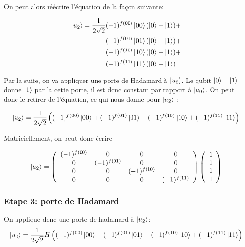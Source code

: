 On peut alors réécrire l'équation de la façon suivante: 



\begin{align*}
  \ket{u_2} = \frac{1}{2\sqrt{2}} & (-1)^{f(00)} \ket{00}  (\ket{0} - \ket{1}) + \\
&(-1)^{f(01)} \ket{01}  (\ket{0} - \ket{1}) + \\
&(-1)^{f(10)} \ket{10}  (\ket{0} - \ket{1}) + \\
&(-1)^{f(11)} \ket{11}  (\ket{0} - \ket{1}) 
\end{align*}

Par la suite, on va appliquer une porte de Hadamard à $\ket{u_2}$. Le qubit $\ket{0} - \ket{1}$ donne $\ket{1}$ par la cette porte, il est donc constant par rapport à $\ket{u_0}$. On peut donc le retirer de l'équation, ce qui nous donne pour $\ket{u_2}$ :

\begin{equation}
  \label{eq:3}
\ket{u_2} = \frac{1}{2\sqrt{2}} \left( (-1)^{f(00)} \ket{00} + (-1)^{f(01)} \ket{01} + (-1)^{f(10)} \ket{10} + (-1)^{f(11)} \ket{11} \right) 
\end{equation}


Matriciellement, on peut donc écrire

\begin{equation}
  \label{eq:4}
\ket{u_2} = \left(  \begin{array}{cccc}
     (-1)^{f(00)}  &0 & 0 &0 \\
     0 & (-1)^{f(01)} & 0 &0 \\
     0 &0 & (-1)^{f(10)} &0 \\
     0 &0 & 0 & (-1)^{f(11)} \\
        \end{array}
      \right)
      \left(  \begin{array}{c}
                1 \\
                1 \\
                1 \\
                1 
              \end{array}
      \right)      
\end{equation}


\subsubsection{Etape 3: porte de Hadamard}

On applique donc une porte de hadamard à $\ket{u_2}$:
\begin{equation}
  \label{eq:5}
\ket{u_3} = \frac{1}{2\sqrt{2}} H \left( (-1)^{f(00)} \ket{00} + (-1)^{f(01)} \ket{01} + (-1)^{f(10)} \ket{10} + (-1)^{f(11)} \ket{11} \right) 
\end{equation}

